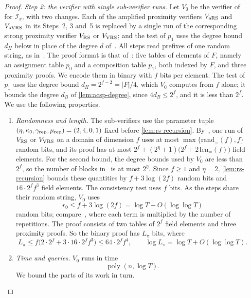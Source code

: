 \documentclass[11pt,letterpaper]{article}
\theoremstyle{definition}
\theoremstyle{remark}
\newcommand{\poly}{\operatorname{poly}}
\newcommand{\abs}[1]{\left|#1\right|}
\begin{document}
\begin{proof}
\emph{Step 2: the verifier with single sub-verifier runs.} Let \(V_0\)
be the verifier of~\cite[Construction~8.5]{BCGT13} for
\(\mathcal I_x\), with two changes. Each of the amplified
proximity verifiers \(V_{\rm aRS}\) and \(V_{\rm aVRS}\) in its Steps~2,
3 and~5 is replaced by a single run of the corresponding strong
proximity verifier \(V_{\rm RS}\) or \(V_{\rm VRS}\); and the test of
\(p_1\) uses the degree bound \(d_H\) below in place of the degree \(d\)
of~\cite[Construction~8.5]{BCGT13}. All steps read
prefixes of one random string, as in~\cite[Algorithm~9]{BCGT13}. The
proof format is that of~\cite[Definition~8.4]{BCGT13}: five tables of
elements of \(F\), namely an assignment table \(p_0\) and a composition
table \(p_1\), both indexed by \(F\), and three proximity proofs. We
encode them in binary with \(f\) bits per element. The test of \(p_1\)
uses the degree bound \(d_H=2^{f-2}=\abs F/4\), which \(V_0\) computes
from \(f\) alone; it bounds the degree \(d_B\) of \cref{lem:acsp-degree},
since \(4d_B\le2^f\), and it is less than \(2^f\). We use the following
properties.
\begin{enumerate}[label=(\alph*)]
\item \emph{Randomness and length.} The sub-verifiers use the
parameter tuple \((\eta,\kappa_0,\gamma_{\rm rep},\mu_{\rm rep})=(2,4,0,1)\)
fixed before \cref{lem:rs-recursion}. By~\cite[Lemmas~C.2--C.5]{BCGT13},
one run of \(V_{\rm RS}\) or \(V_{\rm VRS}\) on a domain of dimension
\(f\) uses at most \(\max\{\mathrm{rand}_=(f),f\}\) random bits, and its
proof has at most \(2^f+(2^\eta+1)\bigl(2^f+2\,\mathrm{len}_=(f)\bigr)\)
field elements. For the second bound, the degree bounds used by
\(V_0\) are less than \(2^f\), so the number of blocks
in~\cite[Lemma~C.3]{BCGT13} is at most \(2^\eta\). Since \(f\ge1\) and
\(\eta=2\), \cref{lem:rs-recursion} bounds these quantities by
\(f+3\log(2f)\) random bits and \(16\cdot2^ff^3\) field elements. The
consistency test uses \(f\) bits. As the steps share their random
string, \(V_0\) uses
\[
 r_0\le f+3\log(2f)=\log T+O(\log\log T)
\]
random bits; compare~\cite[Lemma~C.8]{BCGT13}, where each term is
multiplied by the number of repetitions. The proof consists of two
tables of \(2^f\) field elements and three proximity proofs. So the
binary proof has \(L_\pi\) bits, where
\[
 L_\pi\le f\bigl(2\cdot2^f+3\cdot16\cdot2^ff^3\bigr)\le64\cdot2^ff^4,
 \qquad \log L_\pi=\log T+O(\log\log T).
\]
\item \emph{Time and queries.} \(V_0\) runs in time
\[
 \poly(n,\log T).
\]
We bound the parts of its work in turn.

\end{enumerate}
\end{proof}
\end{document}

